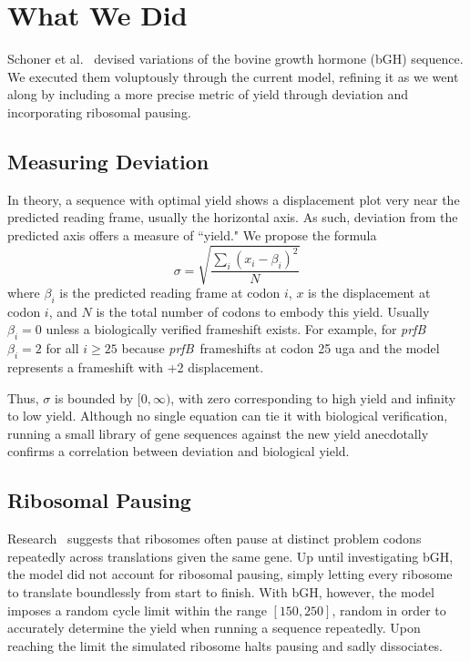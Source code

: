 \documentclass[10pt,twocolumn,draft]{article}
\newcommand{\prfB}{\emph{prfB}}
\begin{document}
\section{What We Did}
\label{whatwedid}

Schoner et al.~\cite{schoner:bgh} devised variations of the bovine growth hormone (bGH) sequence.
We executed them voluptously through the current model, refining it as we went along by including
a more precise metric of yield through deviation and incorporating ribosomal pausing.

\subsection{Measuring Deviation}
\label{whatwedid:lbd}

In theory, a sequence with optimal yield shows a displacement plot very near the predicted reading frame,
usually the horizontal axis. As such, deviation from the predicted axis offers a measure of ``yield."
We propose the formula
\begin{equation}
    \label{eqn:lbd}
    \sigma = \sqrt{\frac{\sum_i \left(x_i - \beta_i\right)^2}{N}}
\end{equation}
where $\beta_i$ is the predicted reading frame at codon $i$, $x$ is the displacement at codon $i$,
and $N$ is the total number of codons to embody this yield. Usually $\beta_i = 0$ unless a biologically verified frameshift exists. For example, for \prfB\ $\beta_i = 2$ for all $i \geq 25$ because \prfB\ frameshifts at codon 25 uga
and the model represents a frameshift with +2 displacement.

Thus, $\sigma$ is bounded by $[0,\infty)$, with zero corresponding to high yield and infinity to low yield.
Although no single equation can tie it with biological verification, running a small library of gene sequences
against the new yield anecdotally confirms a correlation between deviation and biological yield.

\subsection{Ribosomal Pausing}
\label{rp}

Research~\cite{gowri:pause} suggests that ribosomes often pause at distinct problem codons repeatedly
across translations given the same gene. Up until investigating bGH, the model did not
account for ribosomal pausing, simply letting every ribosome to translate boundlessly from start to finish. With
bGH, however, the model imposes a random cycle limit within the range $[150,250]$, random in order to accurately
determine the yield when running a sequence repeatedly. Upon reaching the limit the simulated ribosome
halts pausing and sadly dissociates.
\end{document}
